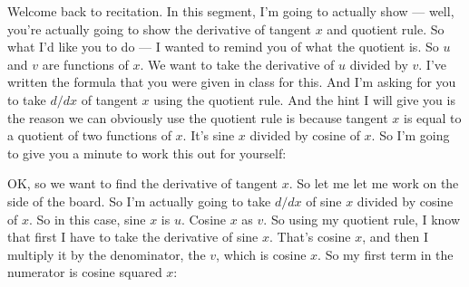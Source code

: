 \documentclass[pdftex, brazil, 12pt, twoside]{article}
\begin{document}
Welcome back to recitation.
In this segment, I'm going to actually show ---
well, you're actually going to show the derivative of tangent
$x$ and quotient rule.
So what I'd like you to do ---
I wanted to remind you of what the quotient is.
So $u$ and $v$ are functions of $x$.
We want to take the derivative of $u$ divided
by $v$. I've written the formula that you
were given in class for this.
And I'm asking for you to take $d/dx$ of tangent $x$
using the quotient rule.
And the hint I will give you is the reason we can obviously
use the quotient rule is because tangent $x$ is
equal to a quotient of two functions of $x$.
It's sine $x$ divided by cosine of $x$.
So I'm going to give you a minute
to work this out for yourself:

\begin{figure}[H]
  \begin{center}
  \end{center}
\end{figure}

OK, so we want to find the derivative of tangent $x$.
So let me let me work on the side of the board.
So I'm actually going to take $d/dx$ of sine $x$ divided
by cosine of $x$.
So in this case, sine $x$ is $u$.
Cosine $x$ as $v$.
So using my quotient rule, I know
that first I have to take the derivative of sine $x$.
That's cosine $x$, and then I multiply it
by the denominator, the $v$, which is cosine $x$.
So my first term in the numerator is cosine squared $x$:

\begin{figure}[H]
  \begin{center}
  \end{center}
\end{figure}
\end{document}
